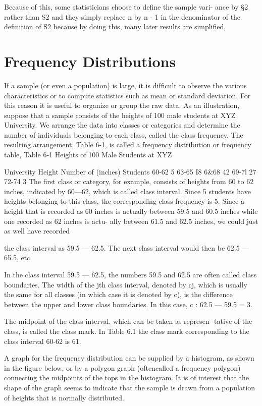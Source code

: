 Because of this, some statisticians choose to deﬁne the sample vari-
ance by §2 rather than S2 and they simply replace n by n - 1 in the
denominator of the deﬁnition of S2 because by doing this, many later
results are simpliﬁed,

\section{Frequency Distributions}
If a sample (or even a population) is large, it is difﬁcult to observe the various characteristics or to compute statistics such as mean or standard deviation. For this reason it is useful to organize or group the raw data. As an illustration, suppose that a sample consists of the heights of 100 male students at XYZ University. We arrange the data into classes or
categories and determine the number of individuals belonging to each class, called the class frequency. The resulting arrangement, Table 6-1, is called a frequency distribution or frequency table, Table 6-1 Heights of 100 Male Students at XYZ 

University
Height Number of
(inches) Students
60-62 5
63-65 I8
6&68 42
69-7l 27
72-74 3
The ﬁrst class or category, for example, consists of heights from 60
to 62 inches, indicated by 60—62, which is called class interval. Since 5
students have heights belonging to this class, the corresponding class
frequency is 5. Since a height that is recorded as 60 inches is actually
between 59.5 and 60.5 inches while one recorded as 62 inches is actu-
ally between 61.5 and 62.5 inches, we could just as well have recorded

the class interval as 59.5 — 62.5. The next
class interval would then be 62.5 — 65.5, etc.

In the class interval 59.5 — 62.5, the numbers 59.5 and 62.5 are often called class boundaries. The width of the jth class interval, denoted by cj, which is usually the same for all classes (in which
case it is denoted by c), is the difference between the upper and lower
class boundaries. In this case, c : 62.5 — 59.5 = 3.

The midpoint of the class interval, which can be taken as represen-
tative of the class, is called the class mark. In Table 6.1 the class mark
corresponding to the class interval 60-62 is 61.

A graph for the frequency distribution can be supplied by a histogram, as shown in the ﬁgure below, or by a polygon graph (oftencalled a frequency polygon) connecting the midpoints of the tops in the
histogram. It is of interest that the shape of the graph seems to indicate that the sample is drawn from a population of heights that is normally distributed.

